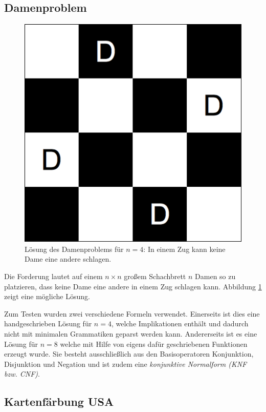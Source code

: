 \documentclass[ngerman,a4paper,abstracton,open=right,twoside=false,toc=listofnumbered,bibtotocnumbered]{scrreprt}
\begin{document}
\subsection{Damenproblem}

\begin{figure}[ht]
	\begin{center}
		\includegraphics[scale=0.5]{img/four-queens}
	\end{center}
	\caption{\label{four-queens} Lösung des Damenproblems für $n = 4$: In einem Zug kann keine Dame eine andere schlagen.}
\end{figure}

Die Forderung lautet auf einem $n \times n$ großem Schachbrett $n$ Damen so zu platzieren, dass keine Dame eine andere in einem Zug schlagen kann. Abbildung \ref{four-queens} zeigt eine mögliche Lösung.

Zum Testen wurden zwei verschiedene Formeln verwendet. Einerseits ist dies eine handgeschrieben Lösung für $n = 4$, welche Implikationen enthält und dadurch nicht mit minimalen Grammatiken geparst werden kann. Andererseits ist es eine Lösung für $n = 8$ welche mit Hilfe von eigens dafür geschriebenen Funktionen erzeugt wurde. Sie besteht ausschließlich aus den Basisoperatoren Konjunktion, Disjunktion und Negation und ist zudem eine \emph{konjunktive Normalform (KNF bzw. CNF)}.

\subsection{Kartenfärbung USA}
\end{document}

